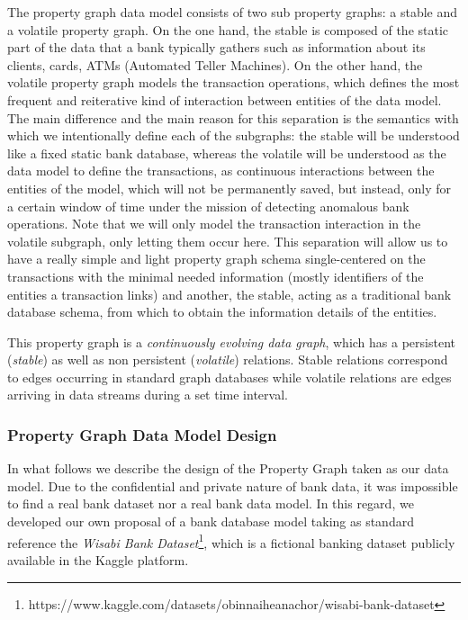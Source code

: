 The property graph data model consists of two sub property graphs: a stable and a volatile property graph. On the one hand, the stable is composed of the static part of the data that a bank typically gathers such as information about its clients, cards, ATMs (Automated Teller Machines). 
On the other hand, the volatile property graph models the transaction operations, which defines the most frequent and reiterative kind of interaction between entities of the data model.\\
The main difference and the main reason for this separation is the semantics with which we intentionally define each of the subgraphs: the stable will be understood like a fixed static bank database, whereas the volatile will be understood as the data model to define the transactions, as continuous interactions between the entities of the model, which will not be permanently saved, but instead, only for a certain window of time under the mission of detecting anomalous bank operations. Note that we will only model the transaction interaction in the volatile subgraph, only letting them occur here.
This separation will allow us to have a really simple and light property graph schema single-centered on the transactions with the minimal needed information (mostly identifiers of the entities a transaction links) and another, the stable, acting as a traditional bank database schema, from which to obtain the information details of the entities.


This property graph is a \emph{continuously evolving data graph}, which has a persistent (\emph{stable}) as well as non persistent (\emph{volatile}) relations. Stable relations correspond to edges occurring in standard graph databases while volatile relations are edges arriving in data streams during a set time interval. 

\subsubsection*{Property Graph Data Model Design}

In what follows we describe the design of the Property Graph taken as our data model. Due to the confidential and private nature of bank data, it was impossible to find a real bank dataset nor a real bank data model. In this regard, we developed our own proposal of a bank database model taking as standard reference the \emph{Wisabi Bank Dataset}\footnote{https://www.kaggle.com/datasets/obinnaiheanachor/wisabi-bank-dataset}, which is a fictional banking dataset publicly available in the Kaggle platform. 

